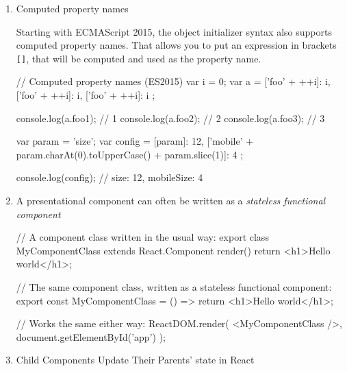 \documentclass[a4paper,12pt]{article}
\begin{document}
\begin{enumerate}

\item Computed property names

Starting with ECMAScript 2015, the object initializer syntax also supports computed property names. That allows you to put an expression in brackets \verb|[]|, that will be computed and used as the property name.
\begin{jscode}
// Computed property names (ES2015)
var i = 0;
var a = {
  ['foo' + ++i]: i,
  ['foo' + ++i]: i,
  ['foo' + ++i]: i
};

console.log(a.foo1); // 1
console.log(a.foo2); // 2
console.log(a.foo3); // 3

var param = 'size';
var config = {
  [param]: 12,
  ['mobile' + param.charAt(0).toUpperCase() + param.slice(1)]: 4
};

console.log(config); // {size: 12, mobileSize: 4}
\end{jscode}

\item A presentational component can often be written as a \textit{stateless functional component}

\begin{jscode}
// A component class written in the usual way:
export class MyComponentClass extends React.Component {
  render() {
    return <h1>Hello world</h1>;
  }
}

// The same component class, written as a stateless functional component:
export const MyComponentClass = () => {
  return <h1>Hello world</h1>;
}

// Works the same either way:
ReactDOM.render(
	<MyComponentClass />,
	document.getElementById('app')
);
\end{jscode}

\item Child Components Update Their Parents' state in React


\end{enumerate}
\end{document}
